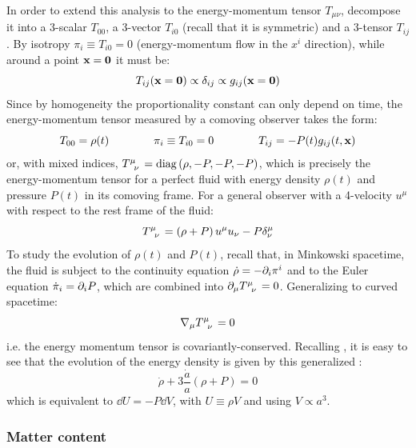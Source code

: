 In order to extend this analysis to the energy-momentum tensor $ T_{\mu \nu} $, decompose it into a 3-scalar $ T_{00} $, a 3-vector $ T_{i0} $ (recall that it is symmetric) and a 3-tensor $ T_{ij} $. By isotropy $ \pi_i \equiv T_{i0} = 0 $ (energy-momentum flow in the $ x^i $ direction), while around a point $ \mathbf{x} = \mathbf{0} $ it must be:
\begin{equation*}
  T_{ij}(\mathbf{x} = \mathbf{0}) \propto \delta_{ij} \propto g_{ij}(\mathbf{x} = \mathbf{0})
\end{equation*}
Since by homogeneity the proportionality constant can only depend on time, the energy-momentum tensor measured by a comoving observer takes the form:
\begin{equation*}
  T_{00} = \rho(t)
  \qquad \qquad
  \pi_i \equiv T_{i0} = 0
  \qquad \qquad
  T_{ij} = - P(t) g_{ij}(t,\mathbf{x})
\end{equation*}
or, with mixed indices, $ \tensor{T}{^\mu_\nu} = \diag \left( \rho , -P , -P , -P \right) $, which is precisely the energy-momentum tensor for a perfect fluid with energy density $ \rho(t) $ and pressure $ P(t) $ in its comoving frame. For a general observer with a 4-velocity $ u^\mu $ with respect to the rest frame of the fluid:
\begin{equation}
  \tensor{T}{^\mu_\nu} = \left( \rho + P \right) u^\mu u_\nu - P \delta^\mu_\nu
  \label{eq:flrw-en-mom-tens}
\end{equation}
To study the evolution of $ \rho(t) $ and $ P(t) $, recall that, in Minkowski spacetime, the fluid is subject to the continuity equation $ \dot{\rho} = -\partial_i \pi^i $ and to the Euler equation $ \dot{\pi}_i = \partial_i P $, which are combined into $ \pa_\mu \tensor{T}{^\mu_\nu} = 0 $. Generalizing to curved spacetime:
\begin{equation}
  \na_\mu \tensor{T}{^\mu_\nu} = 0
\end{equation}
i.e. the energy momentum tensor is covariantly-conserved. Recalling , it is easy to see that the evolution of the energy density is given by this generalized :
\begin{equation}
  \dot{\rho} + 3 \frac{\dot{a}}{a} \left( \rho + P \right) = 0
  \label{eq:r-p}
\end{equation}
which is equivalent to $ \dd U = - P \dd V $, with $ U \equiv \rho V $ and using $ V \propto a^3 $.

\subsubsection{Matter content}
\label{sssec:matter-content}

